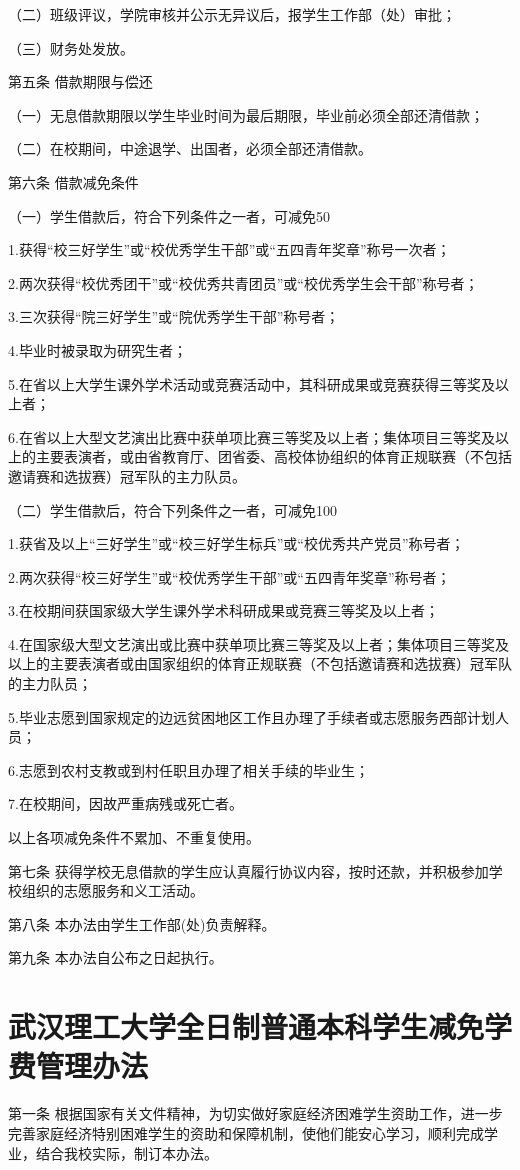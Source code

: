 \documentclass[UTF8,12pt,a4paper]{report}
\begin{document}
（二）班级评议，学院审核并公示无异议后，报学生工作部（处）审批；

（三）财务处发放。

第五条 借款期限与偿还

（一）无息借款期限以学生毕业时间为最后期限，毕业前必须全部还清借款；

（二）在校期间，中途退学、出国者，必须全部还清借款。

第六条 借款减免条件

（一）学生借款后，符合下列条件之一者，可减免50%

1.获得“校三好学生”或“校优秀学生干部”或“五四青年奖章”称号一次者；

2.两次获得“校优秀团干”或“校优秀共青团员”或“校优秀学生会干部”称号者；

3.三次获得“院三好学生”或“院优秀学生干部”称号者；

4.毕业时被录取为研究生者；

5.在省以上大学生课外学术活动或竞赛活动中，其科研成果或竞赛获得三等奖及以上者；

6.在省以上大型文艺演出比赛中获单项比赛三等奖及以上者；集体项目三等奖及以上的主要表演者，或由省教育厅、团省委、高校体协组织的体育正规联赛（不包括邀请赛和选拔赛）冠军队的主力队员。

（二）学生借款后，符合下列条件之一者，可减免100%

1.获省及以上“三好学生”或“校三好学生标兵”或“校优秀共产党员”称号者；

2.两次获得“校三好学生”或“校优秀学生干部”或“五四青年奖章”称号者；

3.在校期间获国家级大学生课外学术科研成果或竞赛三等奖及以上者；

4.在国家级大型文艺演出或比赛中获单项比赛三等奖及以上者；集体项目三等奖及以上的主要表演者或由国家组织的体育正规联赛（不包括邀请赛和选拔赛）冠军队的主力队员；

5.毕业志愿到国家规定的边远贫困地区工作且办理了手续者或志愿服务西部计划人员；

6.志愿到农村支教或到村任职且办理了相关手续的毕业生；

7.在校期间，因故严重病残或死亡者。

以上各项减免条件不累加、不重复使用。

第七条 获得学校无息借款的学生应认真履行协议内容，按时还款，并积极参加学校组织的志愿服务和义工活动。

第八条 本办法由学生工作部(处)负责解释。

第九条 本办法自公布之日起执行。

\chapter{武汉理工大学全日制普通本科学生减免学费管理办法}
第一条 根据国家有关文件精神，为切实做好家庭经济困难学生资助工作，进一步完善家庭经济特别困难学生的资助和保障机制，使他们能安心学习，顺利完成学业，结合我校实际，制订本办法。
\end{document}
